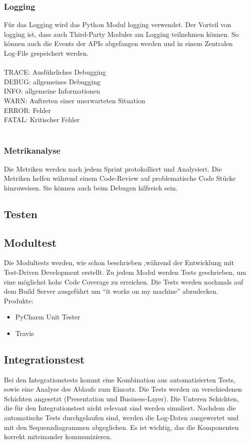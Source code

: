 \documentclass[11pt]{scrartcl}
\begin{document}
\subsubsection{Logging}
Für das Logging wird das Python Modul logging verwendet. Der Vorteil von logging ist, dass auch Third-Party Modules am Logging teilnehmen können. So können auch die Events der APIs abgefangen werden und in einem Zentralen Log-File gespeichert werden.\\
\\
TRACE: Ausführliches Debugging\\
DEBUG: allgemeines Debugging\\
INFO: allgemeine Informationen\\
WARN: Auftreten einer unerwarteten Situation\\
ERROR: Fehler\\
FATAL: Kritischer Fehler\\
\\

\subsubsection{Metrikanalyse}
Die Metriken werden nach jedem Sprint protokolliert und Analysiert. 
Die Metriken helfen während einem Code-Review auf problematische 
Code Stücke hinzuweisen. Sie können auch beim Debugen hilfreich sein.


\subsection{Testen}

\subsection{Modultest}
Die Modultests werden, wie schon beschrieben ,während der Entwicklung mit Test-Driven Development erstellt.
Zu jedem Modul werden Tests geschrieben, um eine möglichst hohe Code 
Coverage zu erreichen.
Die Tests werden nochmals auf dem Build Server ausgeführt um ``it 
works on my machine'' abzudecken.\\

Produkte:
\begin{itemize}
\item PyCharm Unit Tester
\item Travis
\end{itemize}

\subsection{Integrationstest}
Bei den Integrationstests kommt eine Kombination aus automatisierten Tests, sowie eine Analyse des Ablaufs zum Einsatz.
Die Tests werden an verschiedenen Schichten angesetzt (Presentation und Business-Layer). Die Unteren Schichten, die für den Integrationstest nicht relevant sind werden simuliert. Nachdem die automatische Tests durchgelaufen sind, werden die Log-Daten ausgewertet und mit den Sequenzdiagrammen abgeglichen. Es ist wichtig, das die Komponenten korrekt miteinander kommunizieren.\\
\end{document}
